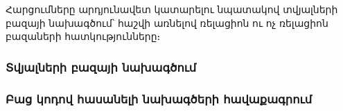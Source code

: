 {
    Հարցումները արդյունավետ կատարելու նպատակով տվյալների բազայի նախագծում՝ հաշվի առնելով ռելացիոն ու ոչ ռելացիոն բազաների հատկությունները։

    \subsubsection{Տվյալների բազայի նախագծում}\label{subsubsec:database}
    

    \subsubsection{Բաց կոդով հասանելի նախագծերի հավաքագրում}\label{subsubsec:sourceCodes}
    
}
